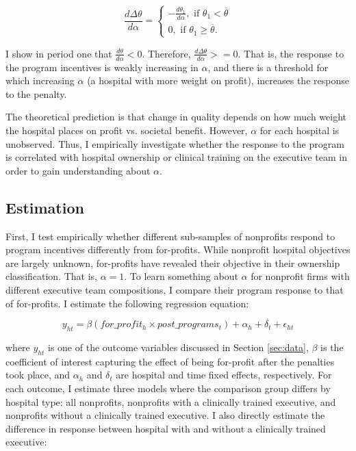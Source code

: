 \documentclass[12pt]{article}
\begin{document}
    $$\frac{d\Delta\theta}{d\alpha} = \begin{cases}
        -\frac{d\theta_1}{d\alpha}, \text{  if  } \theta_1<\overline{\theta}\\
        0, \text{  if  } \theta_1\geq \overline{\theta}.
    \end{cases}$$

    I show in period one that $\frac{d\theta}{d\alpha}<0$. Therefore, $\frac{d\Delta\theta}{d\alpha}>=0$. That is, the response to the program incentives is weakly increasing in $\alpha$, and there is a threshold for which increasing $\alpha$ (a hospital with more weight on profit), increases the response to the penalty. 

    The theoretical prediction is that change in quality depends on how much weight the hospital places on profit vs. societal benefit. However, $\alpha$ for each hospital is unobserved. Thus, I empirically investigate whether the response to the program is correlated with hospital ownership or clinical training on the executive team in order to gain understanding about $\alpha$. 

    \subsection{Estimation}

    First, I test empirically whether different sub-samples of nonprofits respond to program incentives differently from for-profits. While nonprofit hospital objectives are largely unknown, for-profits have revealed their objective in their ownership classification. That is, $\alpha=1$. To learn something about $\alpha$ for nonprofit firms with different executive team compositions, I compare their program response to that of for-profits. I estimate the following regression equation:

    \begin{equation}
    \label{eq:forprofit}
    y_{ht} = \beta (for\_profit_h \times post\_programs_t) + \alpha_{h} + \delta_t + \epsilon_{ht}
    \end{equation}

    \noindent where $y_{ht}$ is one of the outcome variables discussed in Section \ref{sec:data}, $\beta$ is the coefficient of interest capturing the effect of being for-profit after the penalties took place, and $\alpha_h$ and $\delta_t$ are hospital and time fixed effects, respectively. For each outcome, I estimate three models where the comparison group differs by hospital type: all nonprofits, nonprofits with a clinically trained executive, and nonprofits without a clinically trained executive. I also directly estimate the difference in response between hospital with and without a clinically trained executive:
\end{document}
